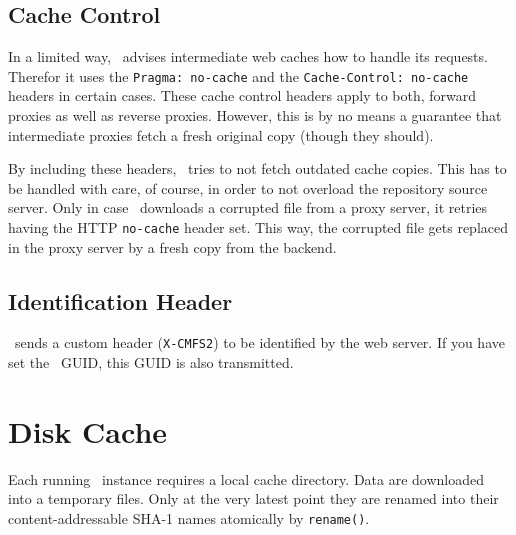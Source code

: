 \subsection{Cache Control}
\label{sct:cachecontrol}
In a limited way, \cvmfs\ advises intermediate web caches how to handle its requests.
Therefor it uses the \texttt{Pragma:~no-cache} and the \texttt{Cache-Control:~no-cache} headers in certain cases.
These cache control headers apply to both, forward proxies as well as reverse proxies.
However, this is by no means a guarantee that intermediate proxies fetch a fresh original copy (though they should).

By including these headers, \cvmfs\ tries to not fetch outdated cache copies.
This has to be handled with care, of course, in order to not overload the repository source server.
Only in case \cvmfs\ downloads a corrupted file from a proxy server, it retries having the HTTP \texttt{no-cache} header set.
This way, the corrupted file gets replaced in the proxy server by a fresh copy from the backend.

\subsection{Identification Header}
\cvmfs\ sends a custom header (\lstinline{X-CMFS2}) to be identified by the web server.
If you have set the \cernvm\ GUID, this GUID is also transmitted.

\section{Disk Cache}
\label{sct:mamangedcache}
Each running \cvmfs\ instance requires a local cache directory.
Data are downloaded into a temporary files.
Only at the very latest point they are renamed into their content-addressable SHA-1 names atomically by \texttt{rename()}.

